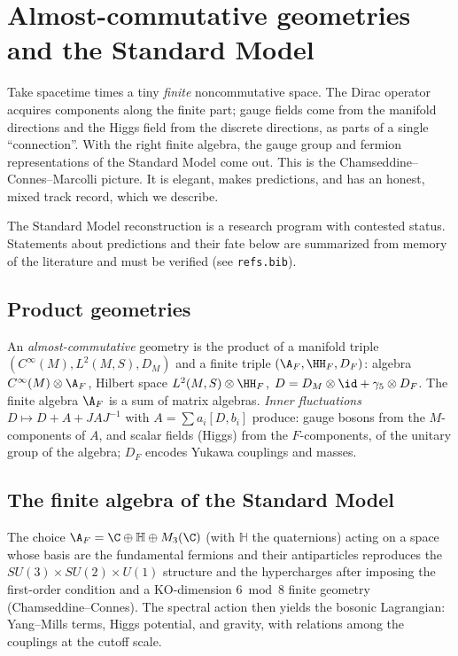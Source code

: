 \chapter{Almost-commutative geometries and the Standard Model}\label{ch:almost_comm}
\skippable

\begin{physmotiv}
Take spacetime times a tiny \emph{finite} noncommutative space. The Dirac operator acquires components along the finite part; gauge fields come from the manifold directions and the Higgs field from the discrete directions, as parts of a single ``connection''. With the right finite algebra, the gauge group and fermion representations of the Standard Model come out. This is the Chamseddine--Connes--Marcolli picture. It is elegant, makes predictions, and has an honest, mixed track record, which we describe.
\end{physmotiv}

\begin{unsettled}
The Standard Model reconstruction is a research program with contested status. Statements about predictions and their fate below are summarized from memory of the literature and must be verified (see \texttt{refs.bib}).
\end{unsettled}

\section{Product geometries}

An \emph{almost-commutative} geometry is the product of a manifold triple $(C^\infty(M),L^2(M,S),D_M)$ and a finite triple $(\A_F,\HH_F,D_F)$: algebra $C^\infty(M)\otimes\A_F$, Hilbert space $L^2(M,S)\otimes\HH_F$, $D=D_M\otimes\id+\gamma_5\otimes D_F$. The finite algebra $\A_F$ is a sum of matrix algebras. \emph{Inner fluctuations} $D\mapsto D+A+JAJ^{-1}$ with $A=\sum a_i[D,b_i]$ produce: gauge bosons from the $M$-components of $A$, and scalar fields (Higgs) from the $F$-components, of the unitary group of the algebra; $D_F$ encodes Yukawa couplings and masses.

\section{The finite algebra of the Standard Model}

The choice $\A_F=\C\oplus\mathbb H\oplus M_3(\C)$ (with $\mathbb H$ the quaternions) acting on a space whose basis are the fundamental fermions and their antiparticles reproduces the $SU(3)\times SU(2)\times U(1)$ structure and the hypercharges after imposing the first-order condition and a KO-dimension $6\bmod8$ finite geometry (Chamseddine--Connes). The spectral action then yields the bosonic Lagrangian: Yang--Mills terms, Higgs potential, and gravity, with relations among the couplings at the cutoff scale.

